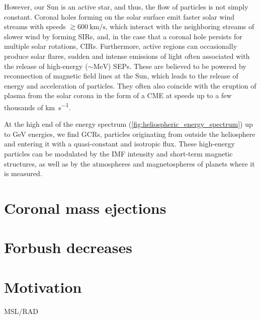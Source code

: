 However, our Sun is an active star, and thus, the flow of particles is not simply constant.
Coronal holes forming on the solar surface emit faster solar wind streams with speeds $\gtrsim \SI{600}{\kilo\meter\per\second}$, which interact with the neighboring streams of slower wind by forming \acp{SIR}, and, in the case that a coronal hole persists for multiple solar rotations, \acp{CIR}.
Furthermore, active regions can occasionally produce solar flares, sudden and intense emissions of light often associated with the release of high-energy ($\sim \si{\mega\electronvolt}$) \acp{SEP}.
These are believed to be powered by reconnection of magnetic field lines at the Sun, which leads to the release of energy and acceleration of particles.
They often also coincide with the eruption of plasma from the solar corona in the form of a \ac{CME} at speeds up to a few thousands of \si{\kilo\meter\per\second}.

At the high end of the energy spectrum (\autoref{fig:heliospheric_energy_spectrum}) up to \si{\giga\electronvolt} energies, we find \acp{GCR}, particles originating from outside the heliosphere and entering it with a quasi-constant and isotropic flux.
These high-energy particles can be modulated by the \ac{IMF} intensity and short-term magnetic structures, as well as by the atmospheres and magnetospheres of planets where it is measured.


\section{Coronal mass ejections}

\section{Forbush decreases}

\section{Motivation}

\ac{MSL}/\ac{RAD}